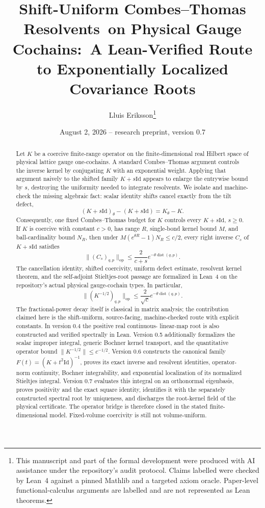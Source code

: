 \documentclass[11pt]{article}
\title{Shift-Uniform Combes--Thomas Resolvents\
on Physical Gauge Cochains:\
A Lean-Verified Route to Exponentially Localized Covariance Roots}
\author{Lluis Eriksson\thanks{This manuscript and part of the formal
development were produced with AI assistance under the repository's audit
protocol.  Claims labelled \formalized{} were checked by Lean~4 against a
pinned Mathlib and a targeted axiom oracle.  Paper-level functional-calculus
arguments are labelled \proved{} and are not represented as Lean theorems.}}
\date{August 2, 2026 -- research preprint, version 0.7}
\theoremstyle{definition}
\newcommand{\Id}{\mathrm{Id}}
\newcommand{\dist}{\operatorname{dist}}
\newcommand{\op}{\mathrm{op}}
\newcommand{\norm}[1]{\lVert #1\rVert}
\begin{document}
\maketitle

\begin{abstract}
Let $K$ be a coercive finite-range operator on the finite-dimensional real
Hilbert space of physical lattice gauge one-cochains.  A standard
Combes--Thomas argument controls the inverse kernel by conjugating $K$ with an
exponential weight.  Applying that argument naively to the shifted family
$K+s\Id$ appears to enlarge the entrywise bound by $s$, destroying the
uniformity needed to integrate resolvents.  We isolate and machine-check the
missing algebraic fact: scalar identity shifts cancel exactly from the tilt
defect,
\[
  (K+s\Id)_\theta-(K+s\Id)=K_\theta-K.
\]
Consequently, one fixed Combes--Thomas budget for $K$ controls every
$K+s\Id$, $s\ge0$.  If $K$ is coercive with constant $c>0$, has range $R$,
single-bond kernel bound $M$, and ball-cardinality bound $N_R$, then under
$M(e^{\theta R}-1)N_R\le c/2$, every right inverse $C_s$ of $K+s\Id$
satisfies
\[
  \norm{(C_s)_{q,p}}_{\op}
  \le \frac{2}{c+s}e^{-\theta\dist(q,p)}.
\]
The cancellation identity, shifted coercivity, uniform defect estimate,
resolvent kernel theorem, and the self-adjoint Stieltjes-root passage are
formalized in Lean~4 on the repository's actual physical gauge-cochain types.
In particular,
\[
  \norm{(K^{-1/2})_{q,p}}_{\op}
  \le \frac{2}{\sqrt c}e^{-\theta\dist(q,p)}.
\]
The fractional-power decay itself is classical in matrix analysis; the
contribution claimed here is the shift-uniform, source-facing, machine-checked
route with explicit constants.  In version 0.4 the positive real continuous-
linear-map root is also constructed and verified spectrally in Lean.  Version
0.5 additionally formalizes the scalar improper integral, generic Bochner
kernel transport, and the quantitative operator bound
$\norm{K^{-1/2}}\le c^{-1/2}$.  Version 0.6 constructs the canonical family
$F(t)=(K+t^2\Id)^{-1}$, proves its exact inverse and resolvent identities,
operator-norm continuity, Bochner integrability, and exponential localization
of its normalized Stieltjes integral.  Version 0.7 evaluates this integral on
an orthonormal eigenbasis, proves positivity and the exact square identity,
identifies it with the separately constructed spectral root by uniqueness,
and discharges the root-kernel field of the physical certificate.  The
operator bridge is therefore closed in the stated finite-dimensional model.
Fixed-volume coercivity is still not volume-uniform.
\end{abstract}
\end{document}
